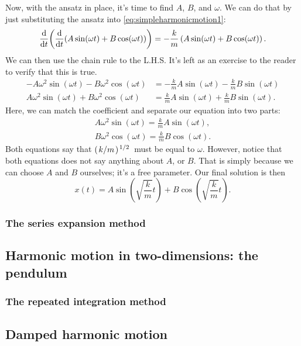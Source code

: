 Now, with the ansatz in place, it's time to find $A$, $B$, and $\omega$. We can do that by just substituting the ansatz into \cref{eq:simpleharmonicmotion1}:
\begin{equation*}
    \dv{t}(\dv{t}(A\sin(\omega t) + B\cos(\omega t))) = -\frac{k}{m}\left(A\sin(\omega t) + B\cos(\omega t)\right).
\end{equation*}
We can then use the chain rule to the L.H.S. It's left as an exercise to the reader to verify that this is true.
\begin{align*}
    -A\omega^2\sin(\omega t) -B\omega^2\cos(\omega t) &= -\frac{k}{m}A\sin(\omega t) -\frac{k}{m}B\sin(\omega t) \\
    A\omega^2\sin(\omega t) + B\omega^2\cos(\omega t) &= \frac{k}{m}A\sin(\omega t) + \frac{k}{m}B\sin(\omega t).
\end{align*}
Here, we can match the coefficient and separate our equation into two parts:
\begin{gather*}
    A\omega^2\sin(\omega t) = \frac{k}{m}A\sin(\omega t), \\
    B\omega^2\cos(\omega t) = \frac{k}{m}B\cos(\omega t).
\end{gather*}
Both equations say that $(\flatfrac{k}{m})^{\flatfrac{1}{2}}$ must be equal to $\omega$. However, notice that both equations does not say anything about $A$, or $B$. That is simply because we can choose $A$ and $B$ ourselves; it's a free parameter. Our final solution is then
\begin{equation*}
    x(t) = A\sin(\sqrt{\frac{k}{m}}t) + B\cos(\sqrt{\frac{k}{m}}t).
\end{equation*}

\subsubsection{The series expansion method}

\subsection{Harmonic motion in two-dimensions: the pendulum}


\subsubsection{The repeated integration method}


\subsection{Damped harmonic motion}

